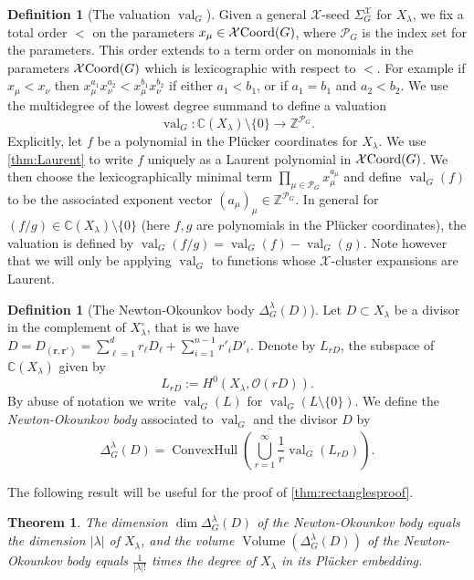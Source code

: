 \documentclass{amsart}
\newtheorem{theorem}[thm]{Theorem}
\theoremstyle{definition}
\newtheorem{defn}[thm]{Definition}
\numberwithin{equation}{section}
\newcommand{\NO}{\Delta}
\newcommand{\Vol}{\operatorname{Volume}}
\newcommand{\C}{\mathbb{C}}
\newcommand{\Z}{\mathbb{Z}}
\newcommand{\val}{{\operatorname{val}}}
\newcommand{\TBG}{{\mathcal X\hskip -.05cm\operatorname{Coord}(G)}}
\newcommand{\openX}{{X}^\circ}
\begin{document}
\begin{defn}[The valuation $\val_G$] \label{de:val}
Given a general 
	$\mathcal{X}$-seed  $\Sigma^{\mathcal X}_G$ for $X_{\lambda}$,
we fix a total order $<$ on the parameters $x_{\mu} \in \TBG$,
where $\mathcal{P}_G$ is the index set for the parameters.
	This order extends
 to a term order on monomials in the parameters $\TBG$
which is lexicographic with respect to $<$. For example if $x_\mu<x_\nu$ then $x_{\mu}^{a_1} x_{\nu}^{a_2}<x_{\mu}^{b_1} x_{\nu}^{b_2}
$ if either $a_1<b_1$, or if $a_1=b_1$ and $a_2<b_2$.
We use the multidegree of the lowest degree summand to define a valuation
\begin{equation} \label{eq:valuation}
\val_{G}:\C(X_{\lambda})\setminus\{0\}\to \Z^{{\mathcal P}_G}.
\end{equation}
Explicitly, let $f$ be  a polynomial in the  Pl\"ucker coordinates
for $X_{\lambda}$. We use  \cref{thm:Laurent}
to write $f$ uniquely as a Laurent polynomial in $\TBG$.
We then choose the  lexicographically minimal term $\prod_{\mu\in{\mathcal P}_G}x_\mu^{a_\mu}$ and define $\val_G(f)$ to be the associated exponent vector $(a_\mu)_\mu\in \Z^{{\mathcal P}_G}$.
In general for
$(f/g) \in \C(X_{\lambda}) \setminus\{0\}$ (here $f,g$ are polynomials
in the Pl\"ucker coordinates), the valuation is defined by
$\val_G(f/g) = \val_G(f) - \val_G(g)$.
Note however
        that we will only  be applying $\val_G$ to functions whose $\mathcal X$-cluster expansions are
        Laurent.
\end{defn}

\begin{defn}[The Newton-Okounkov body $\NO^{\lambda}_G(D)$]\label{def:NObody}
Let $D\subset X_{\lambda}$ be a divisor in the complement of 
$\openX_{\lambda}$, that is we have $D=D_{(\mathbf{r,r'})}=\sum_{\ell=1}^d r_\ell D_\ell
+\sum_{i=1}^{n-1} r'_i D'_i$. 
Denote by $L_{rD}$, the subspace of $\C(X_{\lambda})$ given by
\[
L_{rD}:=H^0(X_{\lambda},\mathcal O(rD)).
\]
By abuse of notation we write $\val_G(L)$ for $\val_G(L \setminus \{0\})$. We define the {\it Newton-Okounkov  body} associated to $\val_G$ and the divisor $D$ by
\begin{equation}\label{e:NOviaNOGr}
\NO^{\lambda}_G(D)=
\overline{\operatorname{ConvexHull}
        \left(\bigcup_{r=1}^{\infty} \frac{1}{r}
\val_G(L_{rD})\right)}.
\end{equation}
\end{defn}

The following result will be useful for the proof of \cref{thm:rectanglesproof}.
\begin{theorem}\cite[Corollary 3.2]{KavehKhovanskii}\label{t:KK}
The dimension 
$\dim \Delta_G^{\lambda}(D)$
of the Newton-Okounkov body 
equals the dimension $|\lambda|$ of $X_{\lambda}$,
and 
the volume
$\Vol(\Delta_G^{\lambda}(D))$ of the Newton-Okounkov body 
equals
$\frac{1}{|\lambda|!}$ times 
the degree of $X_{\lambda}$ in its Pl\"ucker embedding.
\end{theorem}
\end{document}
